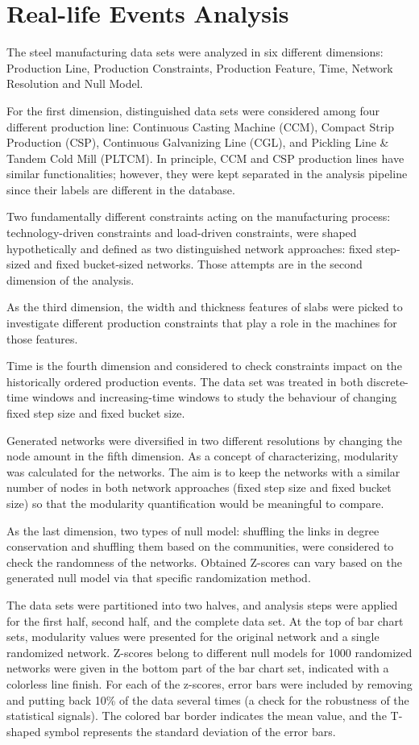 \section{Real-life Events Analysis}
{\color{red} 
The steel manufacturing data sets were analyzed in six different dimensions: Production Line, Production Constraints, Production Feature, Time, Network Resolution and Null Model.

For the first dimension, distinguished data sets were considered among four different production line: Continuous Casting Machine (CCM), Compact Strip Production (CSP), Continuous Galvanizing Line (CGL), and Pickling Line \& Tandem Cold Mill (PLTCM). In principle, CCM and CSP production lines have similar functionalities; however, they were kept separated in the analysis pipeline since their labels are different in the database. 

Two fundamentally different constraints acting on the manufacturing process: technology-driven constraints and load-driven constraints, were shaped hypothetically and defined as two distinguished network approaches: fixed step-sized and fixed bucket-sized networks. Those attempts are in the second dimension of the analysis. 

As the third dimension, the width and thickness features of slabs were picked to investigate different production constraints that play a role in the machines for those features. 

Time is the fourth dimension and considered to check constraints impact on the historically ordered production events. The data set was treated in both discrete-time windows and increasing-time windows to study the behaviour of changing fixed step size and fixed bucket size. 

Generated networks were diversified in two different resolutions by changing the node amount in the fifth dimension. As a concept of characterizing, modularity was calculated for the networks. The aim is to keep the networks with a similar number of nodes in both network approaches (fixed step size and fixed bucket size) so that the modularity quantification would be meaningful to compare. 

As the last dimension, two types of null model: shuffling the links in degree conservation and shuffling them based on the communities, were considered to check the randomness of the networks. Obtained Z-scores can vary based on the generated null model via that specific randomization method.

The data sets were partitioned into two halves, and analysis steps were applied for the first half, second half, and the complete data set. At the top of bar chart sets, modularity values were presented for the original network and a single randomized network. Z-scores belong to different null models for 1000 randomized networks were given in the bottom part of the bar chart set, indicated with a colorless line finish. For each of the z-scores, error bars were included by removing and putting back 10\% of the data several times (a check for the robustness of the statistical signals). The colored bar border indicates the mean value, and the T-shaped symbol represents the standard deviation of the error bars.

}
